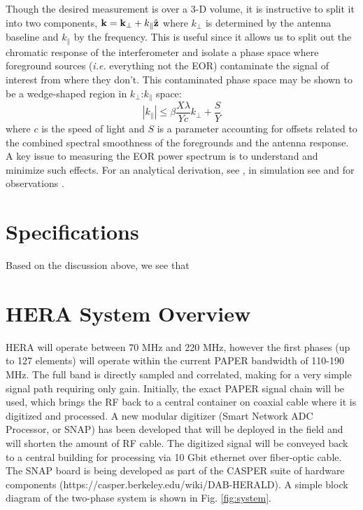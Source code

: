 \documentclass{article}
\newcommand{\kvec}{{\bf k}}
\newcommand{\kpr}{{k_\perp}}
\newcommand{\kvpr}{{\kvec_\perp}}
\newcommand{\kpar}{{k_\parallel}}
\begin{document}
Though the desired measurement is over a 3-D volume, it is instructive to split it into two components,  $\kvec =  \kvpr + \kpar{\hat {\bf z}}$ where $\kpr$ is determined by the antenna baseline and $\kpar$ by the frequency.  This is useful since it allows us to split out the chromatic response of the interferometer and isolate a phase space where foreground sources ({\em i.e.} everything not the EOR) contaminate the signal of interest from where they don't.  This contaminated phase space may be shown to be a wedge-shaped region in $\kpr$:$\kpar$ space:
\begin{equation}
|\kpar| \le \beta\frac{X\lambda}{Yc}\kpr + \frac{S}{Y}
\end{equation}
where $c$ is the speed of light and $S$ is a parameter accounting for offsets related to the combined spectral smoothness of the foregrounds and the antenna response.  
A key issue to measuring the EOR power spectrum is to understand and minimize such effects.  For an analytical derivation, see \cite{2012ApJ...756..165P,vedantham_et_al2012,liu_et_al2014b},  in simulation see \cite{datta_et_al2010,hazelton_et_al2013} and for observations
\cite{2013ApJ...768L..36P,2015arXiv150601026P,2014ApJ...788..106P,2015arXiv150206016A}.

\section{Specifications}
\label{sec:specs}
Based on the discussion above, we see that 

\section{HERA System Overview}
\label{sec:system}
HERA will operate between 70 MHz and 220 MHz, however the first phases (up to 127 elements) will operate within the current PAPER bandwidth of 110-190 MHz.  The full band is directly sampled and correlated, making for a very simple signal path requiring only gain.  Initially, the exact PAPER signal chain will be used, which brings the RF back to a central container on coaxial cable where it is digitized and processed.  A new modular digitizer (Smart Network ADC Processor, or SNAP) has been developed that will be deployed in the field and will shorten the amount of RF cable.  The digitized signal will be conveyed back to a central building for processing via 10 Gbit ethernet over fiber-optic cable.   The SNAP board is being developed as part of the CASPER suite of hardware components (https://casper.berkeley.edu/wiki/DAB-HERALD).  A simple block diagram of the two-phase system is shown in Fig. \ref{fig:system}.
\end{document}
